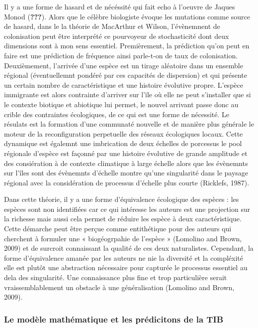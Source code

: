 Il y a une forme de hasard et de nécéssité qui fait echo à l'oeuvre de
Jaques Monod ({\textbf{???}}). Alors que le célèbre biologiste évoque
les mutations comme source de hasard, dans le la théorie de MacArthur et
Wilson, l'évènemnent de colonisation peut être interprété ce pourvoyeur
de stochasticité dont deux dimensions sont à mon sens essentiel.
Premièrement, la prédiction qu'on peut en faire est une prédiction de
fréquence ainsi parle-t-on de taux de colonisation. Deuxièmement,
l'arrivée d'une espèce est un tirage aléatoire dans un ensemble régional
(éventuellemnt pondéré par ces capacités de dispersion) et qui présente
un certain nombre de caractéristique et une histoire évolutive propre.
L'espèce immigrante est alors contrainte d'arriver sur l'ïle où elle ne
peut s'installer que si le contexte biotique et abiotique lui permet, le
nouvel arrivant passe donc au crible des contraintes écologiques, de ce
qui est une forme de nécessité. Le résulats est la formation d'une
communaté nouvelle et de manière plus générale le moteur de la
reconfiguration perpetuelle des réseaux écologiques locaux. Cette
dynamique est égalemnt une imbrication de deux échelles de porcessus le
pool régionale d'espèce est façonné par une histoire évolutive de grande
amplitude et des consiération à de contexte climatique à large échelle
alors que les évènemnts sur l'îles sont des évènemnts d'échelle montre
qu'une singularité dans le paysage régional avec la considération de
processus d'échelle plus courte (Ricklefs, 1987).

Dans cette théorie, il y a une forme d'équivalence écologique des
espèces : les espèces sont non identifiées car ce qui intéresse les
auteurs est une projection sur la richesse mais aussi cela permet de
réduire les espèce à deux caractéristique. Cette démarche peut être
perçue comme entithétique pour des auteurs qui cherchent à formuler une
« biogéogrpahie de l'espèce » (Lomolino and Brown, 2009) et de surcroit
connaissant la qualité de ces deux naturalistes. Cependant, la forme
d'équivalence amanée par les auteurs ne nie la diversité et la
compléxité elle est plutôt une abstraction nécessaire pour capturée le
processus essentiel au dela des singularité. Une connaissance plus fine
et trop particulière serait vraissemblablement un obstacle à une
généralisation (Lomolino and Brown, 2009).

\subsubsection*{Le modèle mathématique et les prédicitons de la
TIB}\label{le-moduxe8le-mathuxe9matique-et-les-pruxe9dicitons-de-la-tib}

